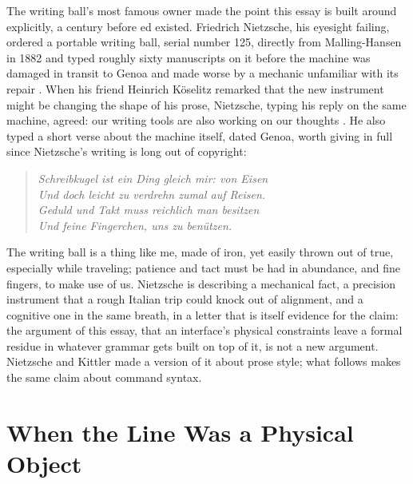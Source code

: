 \documentclass[11pt]{article}
\begin{document}
The writing ball's most famous owner made the point this essay is built around explicitly, a century before ed existed. Friedrich Nietzsche, his eyesight failing, ordered a portable writing ball, serial number 125, directly from Malling-Hansen in 1882 and typed roughly sixty manuscripts on it before the machine was damaged in transit to Genoa and made worse by a mechanic unfamiliar with its repair \cite{openculture2022}. When his friend Heinrich Köselitz remarked that the new instrument might be changing the shape of his prose, Nietzsche, typing his reply on the same machine, agreed: our writing tools are also working on our thoughts \cite{kittler1999}. He also typed a short verse about the machine itself, dated Genoa, worth giving in full since Nietzsche's writing is long out of copyright:
\begin{quote}
\textit{Schreibkugel ist ein Ding gleich mir: von Eisen\\
Und doch leicht zu verdrehn zumal auf Reisen.\\
Geduld und Takt muss reichlich man besitzen\\
Und feine Fingerchen, uns zu benützen.}
\end{quote}
The writing ball is a thing like me, made of iron, yet easily thrown out of true, especially while traveling; patience and tact must be had in abundance, and fine fingers, to make use of us. Nietzsche is describing a mechanical fact, a precision instrument that a rough Italian trip could knock out of alignment, and a cognitive one in the same breath, in a letter that is itself evidence for the claim: the argument of this essay, that an interface's physical constraints leave a formal residue in whatever grammar gets built on top of it, is not a new argument. Nietzsche and Kittler made a version of it about prose style; what follows makes the same claim about command syntax.

\section{When the Line Was a Physical Object}
\end{document}
